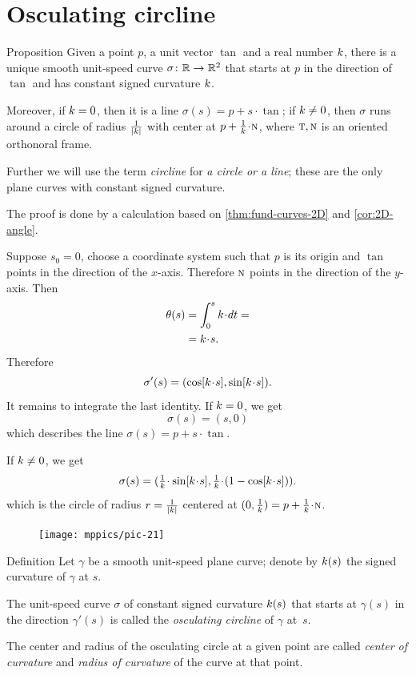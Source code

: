 \section{Osculating circline}

\begin{thm}{Proposition}\label{prop:circline}
Given a point $p$,
a unit vector $\tan$ 
and a real number $k$, there is a unique smooth unit-speed curve $\sigma\colon\mathbb{R}\to\mathbb{R}^2$ 
that starts at $p$ in the direction of $\tan$ and has constant signed curvature $k$.

Moreover, if $k=0$, then it is a line $\sigma(s)=p+s\cdot \tan$;
if $k\ne 0$, then $\sigma$ runs around a circle of radius $\tfrac1{|k|}$ with center at $p+\tfrac1\skur\cdot \norm$, where $\text{\sc{t}},\text{\sc{n}}$ is an oriented orthonoral frame.
\end{thm}

Further we will use the term \emph{circline} for {}\emph{a circle or a line};
these are the only plane curves with constant signed curvature.

The proof is done by a calculation based on \ref{thm:fund-curves-2D} and \ref{cor:2D-angle}.

Suppose $s_0=0$, choose a coordinate system such that $p$ is its origin and $\tan$ points in the direction of the $x$-axis. Therefore $\text{\sc{n}}$ points in the direction of the $y$-axis.
Then
\begin{align*}\theta(s)&=\int_{0}^s\skur\cdot dt=
\\
&=\skur\cdot s.
\end{align*}
Therefore
\[\sigma'(s)=(\cos[\skur\cdot s],\sin[\skur\cdot s]).\]
It remains to integrate the last identity.
If $k=0$, we get 
\[\sigma(s)=(s,0)\]
which describes the line $\sigma(s)=p+s\cdot \tan$.

If $k\ne 0$, we get
\[\sigma(s)=(\tfrac1\skur\cdot\sin[\skur\cdot s],
\tfrac1\skur\cdot(1-\cos[\skur\cdot s])).\]
which is the circle of radius $r=\tfrac1{|k|}$ centered at $(0,\tfrac1\skur)=p+\tfrac1\skur\cdot\norm$.
\qeds


\begin{figure}
\vskip-0mm
\centering
\texttt{[image: mppics/pic-21]}
\vskip0mm
\end{figure}

\begin{thm}{Definition}
Let $\gamma$ be a smooth unit-speed plane curve;
denote by $k(s)$ the signed curvature of $\gamma$ at $s$.

The unit-speed curve $\sigma$ of constant signed curvature $k(s)$ that starts at $\gamma(s)$ in the direction $\gamma'(s)$ is called the \emph{osculating circline} of $\gamma$ at~$s$.

The center and radius of the osculating circle at a given point are called \emph{center of curvature} and \emph{radius of curvature} of the curve at that point.
\end{thm}

